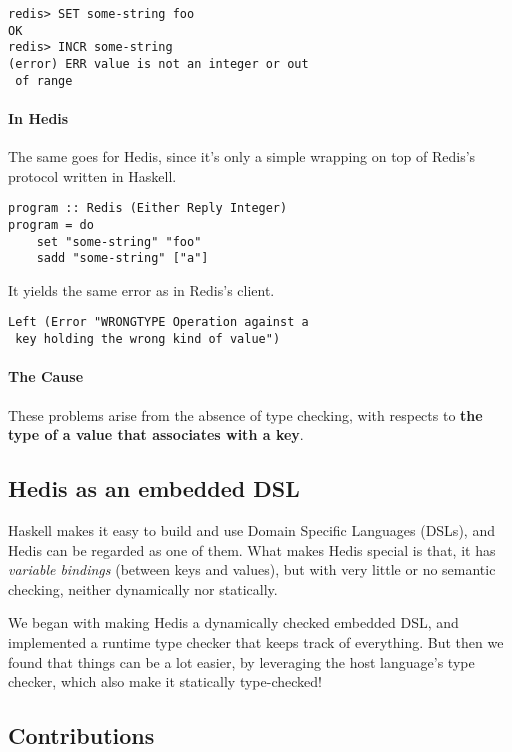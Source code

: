 \documentclass[pldi]{sigplanconf-pldi16}
\begin{document}
\begin{verbatim}
redis> SET some-string foo
OK
redis> INCR some-string
(error) ERR value is not an integer or out
 of range
\end{verbatim}

\paragraph{In Hedis} The same goes for Hedis, since it's only a simple wrapping
 on top of Redis's protocol written in Haskell.

\begin{verbatim}
program :: Redis (Either Reply Integer)
program = do
    set "some-string" "foo"
    sadd "some-string" ["a"]
\end{verbatim}

It yields the same error as in Redis's client.

\begin{verbatim}
Left (Error "WRONGTYPE Operation against a
 key holding the wrong kind of value")
\end{verbatim}

\paragraph{The Cause} These problems arise from the absence of type checking,
 with respects to \textbf{the type of a value that associates with a key}.

\subsection{Hedis as an embedded DSL}

Haskell makes it easy to build and use Domain Specific Languages (DSLs),
 and Hedis can be regarded as one of them. What makes Hedis special is that,
 it has \emph{variable bindings} (between keys and values), but with very
 little or no semantic checking, neither dynamically nor statically.

We began with making Hedis a dynamically checked embedded DSL, and implemented a
 runtime type checker that keeps track of everything. But then we found that
 things can be a lot easier, by leveraging the host language's type checker,
 which also make it statically type-checked!

\subsection{Contributions}
\end{document}
